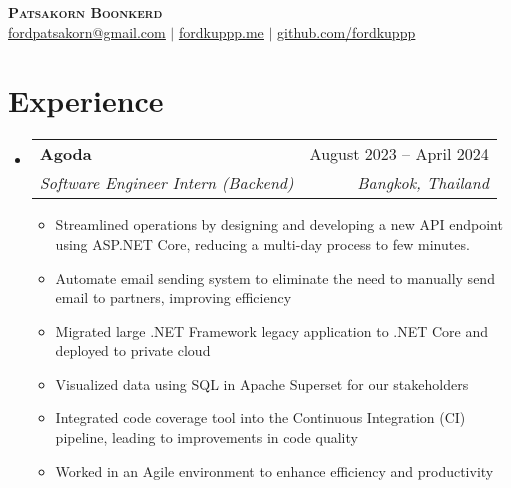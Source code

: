 \documentclass[letterpaper,11pt]{article}
\makeatletter
\newcommand{\resumeItem}[1]{
  \item\small{
    {#1 \vspace{-2pt}}
  }
}
\newcommand{\resumeSubheading}[4]{
  \vspace{-2pt}\item
    \begin{tabular*}{0.97\textwidth}[t]{l@{\extracolsep{\fill}}r}
      \textbf{#1} & #2 \\
      \textit{\small#3} & \textit{\small #4} \\
    \end{tabular*}\vspace{-7pt}
}
\newcommand{\resumeSubHeadingListStart}{\begin{itemize}[leftmargin=0.15in, label={}]}
\newcommand{\resumeSubHeadingListEnd}{\end{itemize}}
\newcommand{\resumeItemListStart}{\begin{itemize}}
\newcommand{\resumeItemListEnd}{\end{itemize}\vspace{-5pt}}
\makeatother
\begin{document}

\begin{center}
    \textbf{\Huge \scshape Patsakorn Boonkerd} \\ \vspace{1pt}
    \footnotesize{
       \href{mailto:fordpatsakorn@gmail.com}{\underline{fordpatsakorn@gmail.com}} $|$ 
       \href{https://fordkuppp.me/}{\underline{fordkuppp.me}} $|$ 
       \href{https://github.com/fordkuppp}{\underline{github.com/fordkuppp}}
    }
\end{center}


\section{Experience}
  \resumeSubHeadingListStart
    \resumeSubheading
      {Agoda}{August 2023 -- April 2024}
      {Software Engineer Intern (Backend)}{Bangkok, Thailand}
      \resumeItemListStart
        \resumeItem{Streamlined operations by designing and developing a new API endpoint using ASP.NET Core, reducing a multi-day process to few minutes.}
        \resumeItem{Automate email sending system to eliminate the need to manually send email to partners, improving efficiency}
        \resumeItem{Migrated large .NET Framework legacy application to .NET Core and deployed to private cloud}
        \resumeItem{Visualized data using SQL in Apache Superset for our stakeholders}
        \resumeItem{Integrated code coverage tool into the Continuous Integration (CI) pipeline, leading to improvements in code quality}
        \resumeItem{Worked in an Agile environment to enhance efficiency and productivity}

      \resumeItemListEnd
  \resumeSubHeadingListEnd

\end{document}
